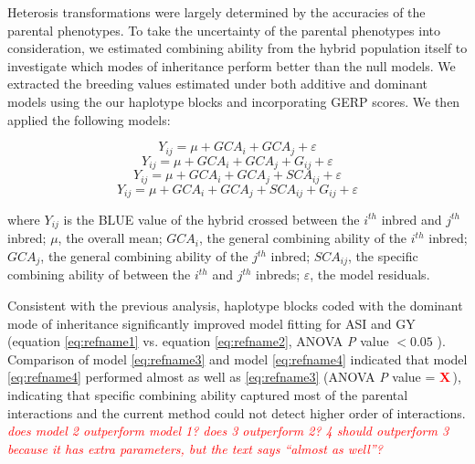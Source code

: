 \documentclass[9pt,twocolumn,twoside]{gsajnl}
\newcommand{\X}{\textcolor{red}{\bf X\,}}
\newcommand{\jri}[1]{\textcolor{red}{ \emph{ #1}} }
\begin{document}
Heterosis transformations were largely determined by the accuracies of the parental phenotypes. 
To take the uncertainty of the parental phenotypes into consideration, we estimated  combining ability from the hybrid population itself to investigate which modes of inheritance perform better than the null models. 
We extracted the breeding values estimated under both additive and dominant models using the our haplotype blocks and incorporating GERP scores. 
We then applied the following models:

\begin{equation}
Y_{ij} = \mu + GCA_{i} + GCA_{j} + \varepsilon
\label{eq:refname1}
\end{equation}
\begin{equation}
Y_{ij} = \mu + GCA_{i} + GCA_{j} +  G_{ij} + \varepsilon
\label{eq:refname2}
\end{equation}
\begin{equation}
Y_{ij} = \mu + GCA_{i} + GCA_{j} + SCA_{ij} + \varepsilon
\label{eq:refname3}
\end{equation}
\begin{equation}
Y_{ij} = \mu + GCA_{i} + GCA_{j} + SCA_{ij} + G_{ij} + \varepsilon
\label{eq:refname4}
\end{equation}

where 
$Y_{ij}$ is the BLUE value of the hybrid crossed between the $i^{th}$ inbred and $j^{th}$ inbred; 
$\mu$, the overall mean; 
$GCA_{i}$, the general combining ability of the $i^{th}$ inbred;
$GCA_{j}$, the general combining ability of the $j^{th}$ inbred;
$SCA_{ij}$, the specific combining ability of between the $i^{th}$ and $j^{th}$ inbreds;
$\varepsilon$, the model residuals.

Consistent with the previous analysis, haplotype blocks coded with the dominant mode of inheritance significantly  improved model fitting for ASI and GY (equation \ref{eq:refname1} vs. equation \ref{eq:refname2}, ANOVA \emph{P} value $<0.05$ ). 
Comparison of model \ref{eq:refname3} and model \ref{eq:refname4} indicated that model \ref{eq:refname4} performed almost as well as \ref{eq:refname3} (ANOVA \emph{P} value = \X), indicating that specific combining ability captured most of the parental interactions and the current method could not detect higher order of interactions. \jri{does model 2 outperform model 1? does 3 outperform 2? 4 should outperform 3 because it has extra parameters, but the text says ``almost as well''?}

\end{document}
